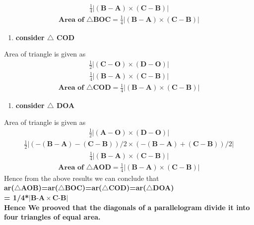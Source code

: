 \documentclass[journal,10pt,twocolumn]{article}
\let\vec\mathbf
\begin{document}
\begin{align}
	\frac{1}{4}{\left | (\vec{B-A})\times(\vec{C-B})\right |}
\end{align}
\begin{align}
 \textbf{Area of $\triangle$BOC} = \frac{1}{4}{\left | (\vec{B-A})\times(\vec{C-B})\right |}
\end{align}
\vspace{5mm}
\begin{enumerate}[3.]
 \item \textbf{consider $\triangle$ COD}
\end{enumerate}
Area of triangle is given as \\
\begin{align}
	\frac{1}{2}{\left |(\vec{C-O})\times(\vec{D-O})\right |}
\end{align}
\begin{align}
	\frac{1}{4}{\left | (\vec{B-A})\times(\vec{C-B})\right |}
\end{align}
\begin{align}
\textbf{Area of $\triangle$COD} = \frac{1}{4}{\left | (\vec{B-A})\times(\vec{C-B})\right |}
\end{align}
\vspace{5mm}
\begin{enumerate}[4.]
\item \textbf{consider $\triangle$ DOA}
\end{enumerate}
Area of triangle is given as \\
\begin{align}
	\frac{1}{2}{\left |( \vec{A-O})\times(\vec{D-O})\right |}
\end{align}
\begin{align}
	\frac{1}{2}{\left | (-(\vec{B-A})-(\vec{C-B}))/2\times(-(\vec{B-A})+(\vec{C-B}))/2\right |}
\end{align}
\begin{align}
	\frac{1}{4}{\left | (\vec{B-A})\times(\vec{C-B})\right |}
\end{align}
\begin{align}
\textbf{Area of $\triangle$AOD} = \frac{1}{4}{\left | (\vec{B-A})\times(\vec{C-B})\right |}
\end{align}
Hence from the above results we can conclude that \vspace{3mm} \\
\textbf{ar($\triangle${AOB})=ar($\triangle${BOC})=ar($\triangle${COD})=ar($\triangle${DOA})\\= 1/4*${\left | \textbf{B-A}\times\textbf{C-B}\right |}$}  \vspace{4mm} \\
\textbf{Hence We prooved that the diagonals of a parallelogram divide it into 
four triangles of equal area.} \vspace{4mm} \\
\end{document}
